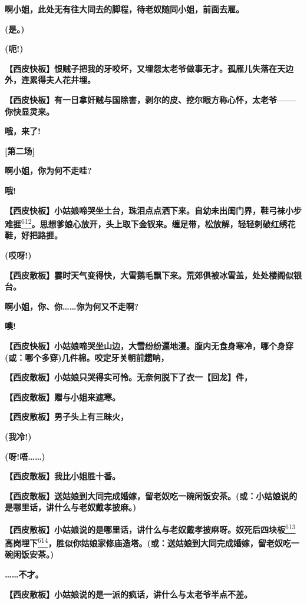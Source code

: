 \textbf{啊小姐，此处无有往大同去的脚程，待老奴随同小姐，前面去雇。}

\textbf{(是。)}

\textbf{(呃!)}

\textbf{【西皮快板】恨贼子把我的牙咬坏，又埋怨太老爷做事无才。孤雁儿失落在天边外，连累得夫人花井埋。}

\textbf{【西皮快板】有一日拿奸贼与国除害，剥尔的皮、挖尔眼方称心怀，太老爷------你快显灵来。}

\textbf{哦，来了!}

\textbf{{[}第二场{]}}

\textbf{啊小姐，你为何不走哇?}

\textbf{哦!}

\textbf{【西皮快板】小姑娘啼哭坐土台，珠泪点点洒下来。自幼未出闺门界，鞋弓袜小步难捱}\protect\hyperlink{fn612}{\textsuperscript{612}}\textbf{。思想爹娘心放开，头上取下金钗来。缠足带，松放解，轻轻刺破红绣花鞋，好把路捱。}

\textbf{(哎呀!)}

\textbf{【西皮散板】霎时天气变得快，大雪鹅毛飘下来。荒郊俱被冰雪盖，处处楼阁似银台。}

\textbf{啊小姐，你、你\ldots{}\ldots{}你为何又不走啊?}

\textbf{噢!}

\textbf{【西皮快板】小姑娘啼哭坐山边，大雪纷纷遍地漫。腹内无食身寒冷，哪个身穿(或：哪个多穿)几件棉。咬定牙关朝前趱呐，}

\textbf{【西皮散板】小姑娘只哭得实可怜。无奈何脱下了衣一【回龙】件，}

\textbf{【西皮散板】赠与小姐来遮寒。}

\textbf{【西皮散板】男子头上有三昧火，}

\textbf{(我冷!)}

\textbf{(呀!唔\ldots{}\ldots{})}

\textbf{【西皮散板】我比小姐胜十番。}

\textbf{【西皮散板】送姑娘到大同完成婚嫁，留老奴吃一碗闲饭安茶。(或：小姑娘说的是哪里话，讲什么与老奴戴孝披麻。)}

\textbf{【西皮散板】小姑娘说的是哪里话，讲什么与老奴戴孝披麻呀。奴死后四块板}\protect\hyperlink{fn613}{\textsuperscript{613}}\textbf{高岗埋下}\protect\hyperlink{fn614}{\textsuperscript{614}}\textbf{，胜似你姑娘家修庙造塔。(或：送姑娘到大同完成婚嫁，留老奴吃一碗闲饭安茶。)}

\textbf{\ldots{}\ldots{}不才。}

\textbf{【西皮散板】小姑娘说的是一派的疯话，讲什么与太老爷半点不差。}

